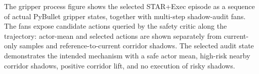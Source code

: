 The gripper process figure shows the selected STAR+Exec episode as a sequence of actual PyBullet gripper states, together with multi-step shadow-audit fans. The fans expose candidate actions queried by the safety critic along the trajectory: actor-mean and selected actions are shown separately from current-only samples and reference-to-current corridor shadows. The selected audit state demonstrates the intended mechanism with a safe actor mean, high-risk nearby corridor shadows, positive corridor lift, and no execution of risky shadows.
